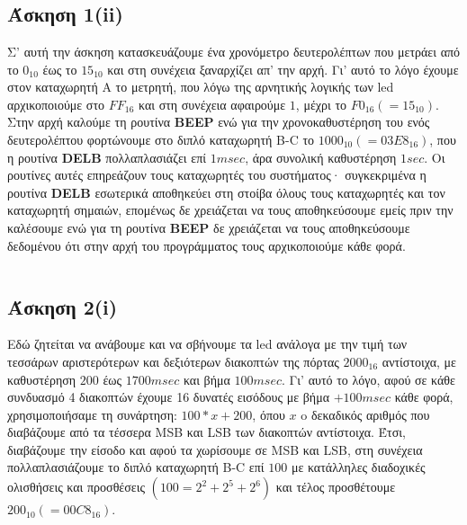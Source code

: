 \documentclass[a4paper,10pt]{article} \usepackage{anysize}
\begin{document}


\section*{} \setcounter{section}{1}
\subsection*{Άσκηση 1(ii)}\setcounter{subsection}{1}
Σ' αυτή την άσκηση κατασκευάζουμε ένα χρονόμετρο δευτερολέπτων που μετράει
από το $0_{10}$ έως το $15_{10}$ και στη συνέχεια ξαναρχίζει απ' την αρχή. Γι' αυτό το λόγο
έχουμε στον καταχωρητή Α το μετρητή, που λόγω της αρνητικής λογικής των led
αρχικοποιούμε στο $FF_{16}$ και στη συνέχεια αφαιρούμε $1$, μέχρι το $F0_{16}
(=15_{10})$. Στην αρχή καλούμε τη ρουτίνα \textbf{BEEP} ενώ για την χρονοκαθυστέρηση
του ενός δευτερολέπτου φορτώνουμε στο διπλό καταχωρητή B-C το $1000_{10}
(=03Ε8_{16})$,
που η ρουτίνα \textbf{DELB} πολλαπλασιάζει επί $1 msec$, άρα συνολική
καθυστέρηση $1 sec$.
Οι ρουτίνες αυτές επηρεάζουν τους καταχωρητές του συστήματος· συγκεκριμένα η
ρουτίνα \textbf{DELB} εσωτερικά αποθηκεύει στη στοίβα όλους τους καταχωρητές και τον
καταχωρητή σημαιών, επομένως δε χρειάζεται να τους αποθηκεύσουμε εμείς πριν
την καλέσουμε ενώ για τη ρουτίνα \textbf{BEEP} δε χρειάζεται να τους αποθηκεύσουμε
δεδομένου ότι στην αρχή του προγράμματος τους αρχικοποιούμε κάθε φορά.
\inputminted[linenos,obeytabs,fontsize=\footnotesize]{oldasm}{../askhsh_1_ii.8085}
\subsection*{Άσκηση 2(i)}
Εδώ ζητείται να ανάβουμε και να σβήνουμε τα led ανάλογα με την τιμή των
τεσσάρων  αριστερότερων και δεξιότερων διακοπτών της πόρτας $2000_{16}$ αντίστοιχα,
με καθυστέρηση $200$ έως $1700 msec$ και βήμα $100 msec$. Γι' αυτό το λόγο, αφού σε
κάθε συνδυασμό 4 διακοπτών έχουμε 16 δυνατές εισόδους με βήμα $+100msec$ κάθε
φορά, χρησιμοποιήσαμε τη συνάρτηση: $100 * x + 200$, όπου $x$ o δεκαδικός αριθμός
που διαβάζουμε από τα τέσσερα MSB και LSB των διακοπτών αντίστοιχα. Έτσι,
διαβάζουμε την είσοδο και αφού τα χωρίσουμε σε MSB και LSB, στη συνέχεια
πολλαπλασιάζουμε το διπλό καταχωρητή B-C επί $100$ με κατάλληλες διαδοχικές
ολισθήσεις και προσθέσεις $(100= 2^2 + 2^5 + 2^6)$ και τέλος προσθέτουμε
$200_{10} (=00C8_{16})$.
\inputminted[linenos,obeytabs,fontsize=\footnotesize]{oldasm}{../askhsh_2_i.8085}
\end{document}

